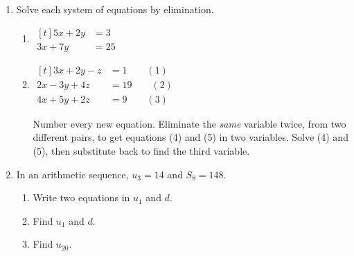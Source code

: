 \documentclass[12pt, twoside]{article}
\begin{document}
\begin{enumerate}[itemsep=0.15cm]

\item[1.]
Solve each system of equations by elimination.

\begin{enumerate}[itemsep=0.15cm]
  \item $\begin{aligned}[t]
    5x + 2y &= 3 \\
    3x + 7y &= 25
  \end{aligned}$ \vfill
  \item $\begin{aligned}[t]
    3x + 2y - z &= 1 \qquad (1) \\
    2x - 3y + 4z &= 19 \qquad (2) \\
    4x + 5y + 2z &= 9 \qquad (3)
  \end{aligned}$

  \smallskip
  Number every new equation. Eliminate the \emph{same} variable twice,
  from two different pairs, to get equations (4) and (5) in two
  variables. Solve (4) and (5), then substitute back to find the third
  variable. \vfill \vfill
\end{enumerate}

\newpage

\item[2.]

\medskip
In an arithmetic sequence, $u_{3} = 14$ and $S_{8} = 148$.

\begin{enumerate}[itemsep=0.15cm]
  \item Write two equations in $u_{1}$ and $d$. \vfill
  \item Find $u_{1}$ and $d$. \vfill
  \item Find $u_{20}$. \vfill
\end{enumerate}


\end{enumerate}
\end{document}
